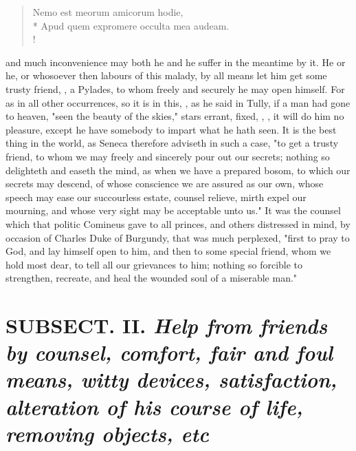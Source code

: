 {\begin{latin}
\begin{verse}%
Nemo est meorum amicorum hodie,\\*
Apud quem expromere occulta mea audeam.\\!
\end{verse}%
\end{latin}

and much inconvenience may both he and he suffer in the meantime by it. He or he, or whosoever then labours of this malady, by all means let him get some trusty friend, , a Pylades, to whom freely and securely he may open himself. For as in all other occurrences, so it is in this, , \etc{} as he said in Tully, if a man had gone to heaven, "seen the beauty of the skies," stars errant, fixed, \etc{}, , it will do him no pleasure, except he have somebody to impart what he hath seen. It is the best thing in the world, as Seneca therefore adviseth in such a case, "to get a trusty friend, to whom we may freely and sincerely pour out our secrets; nothing so delighteth and easeth the mind, as when we have a prepared bosom, to which our secrets may descend, of whose conscience we are assured as our own, whose speech may ease our succourless estate, counsel relieve, mirth expel our mourning, and whose very sight may be acceptable unto us." It was the counsel which that politic Comineus gave to all princes, and others distressed in mind, by occasion of Charles Duke of Burgundy, that was much perplexed, "first to pray to God, and lay himself open to him, and then to some special friend, whom we hold most dear, to tell all our grievances to him; nothing so forcible to strengthen, recreate, and heal the wounded soul of a miserable man."

\section{ SUBSECT. II. \emph{Help from friends by counsel, comfort, fair and foul means, witty devices, satisfaction, alteration of his course of life, removing objects, etc}}


}
